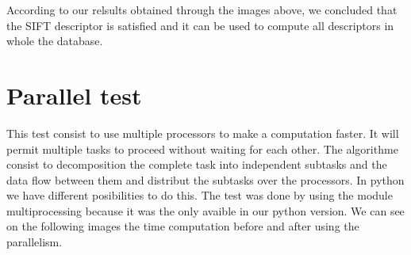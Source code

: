 \documentclass[12pt]{article}
\begin{document}
\begin{figure}[!h]
\centering     %
{}

\end{figure}
 
 According to our relsults obtained through the images above, we concluded that the SIFT descriptor is satisfied and it can be used to compute all descriptors in whole the database. 
 
 \section{ Parallel test}
 
This test consist to use multiple processors to make a computation faster. It will permit multiple tasks to proceed without waiting for each other.
The algorithme consist to decomposition the complete task into independent subtasks and the data flow between them and distribut the subtasks over the processors.
In python we have different posibilities to do this. The test was done by using the module multiprocessing because it was the only avaible in our python version.
We can see on the following images the time computation before and after using the parallelism.
\end{document}
